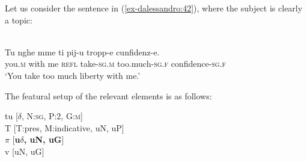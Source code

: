 \documentclass[output=paper
,modfonts
,nonflat]{langsci/langscibook}
\begin{document}
Let us consider the sentence in (\ref{ex-dalessandro:42}), where the subject is clearly a topic:

\begin{exe}
	\ex\label{ex-dalessandro:42}\citet[86]{Rossi2008}\\
	\gll Tu   nghe mme   ti   pij-u     tropp-e   cunfidenz-e.\\
	you.\textsc{m}  with me  \textsc{refl} take-\textsc{sg.m} too.much-\textsc{sg.f} confidence-\textsc{sg.f}\\
	\glt `You take too much liberty with me.'
\end{exe}
The featural setup of the relevant elements is as follows:

\begin{exe}
\ex 
tu [\textbf{$\delta$}, N:\textsc{sg}, P:2, G:\textsc{m}]\\
T [T:pres, M:indicative, uN, uP]\\
$\pi $ [\textbf{u}\textbf{$\delta$}\textbf{, uN, uG}]\\
v  [uN, uG]
\end{exe}
\end{document}
